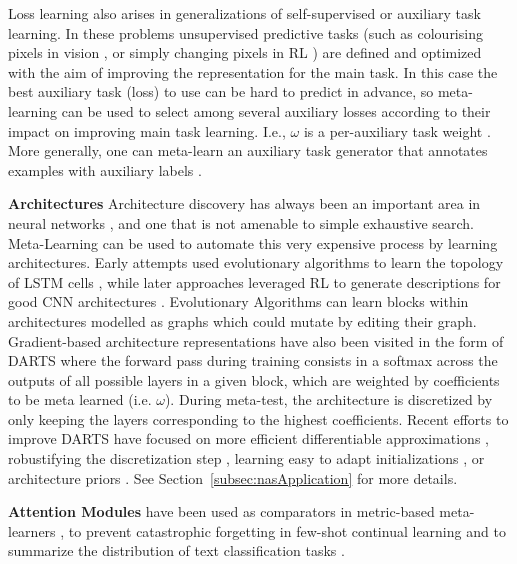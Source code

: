 \documentclass[10pt,journal,compsoc]{IEEEtran}
\newcommand{\keypoint}[1]{\vspace{0.1cm}\noindent\textbf{#1}\quad}
\begin{document}
Loss learning also arises in generalizations of self-supervised
\cite{doersch2017mtlselfsup} or auxiliary task \cite{jaderberg2017unsupauxrl} learning. In these problems unsupervised predictive tasks (such as colourising pixels in vision \cite{doersch2017mtlselfsup}, or simply changing pixels in RL \cite{jaderberg2017unsupauxrl}) are defined and optimized %
with the aim of improving the representation for the main task. In this case the best auxiliary task (loss) to use can be hard to predict in advance, so meta-learning can be used to select among several auxiliary losses according to their impact on improving main task learning. I.e., $\omega$ is a per-auxiliary task weight \cite{xingyu2019auxtask}. More generally, one can meta-learn an auxiliary task generator that annotates examples with auxiliary labels \cite{liu2019self}.




\keypoint{Architectures}
Architecture discovery has always been an important area in neural networks \cite{stanley2019designing,elsken2019nas}, and one that is not amenable to simple exhaustive search. Meta-Learning can be used to automate this very expensive process by learning architectures. Early attempts used evolutionary algorithms to learn the topology of LSTM cells \cite{bayer2009evolvingLSTMcells}, while later approaches leveraged RL to generate descriptions for good CNN architectures \cite{zoph2016neural}. Evolutionary Algorithms \cite{real2018regularized} can learn blocks within architectures modelled as graphs which could mutate by editing their graph. Gradient-based architecture representations have also been visited in the form of DARTS \cite{liu2019darts} where the forward pass during training consists in a softmax across the outputs of all possible layers in a given block, which are weighted by coefficients to be meta learned (i.e. $\omega$). During meta-test, the architecture is discretized by only keeping the layers corresponding to the highest coefficients.
Recent efforts to improve DARTS have focused on more efficient differentiable approximations \cite{xie2019snas}, robustifying the discretization step \cite{Zela2020robustifyingDARTS}, learning easy to adapt initializations \cite{lian2020towards}, or architecture priors \cite{shaw2019meta}. See Section~\ref{subsec:nasApplication} for more details.



\keypoint{Attention Modules} 
have been used as comparators in metric-based meta-learners \cite{hou2019cross}, to prevent catastrophic forgetting in few-shot continual learning \cite{ren2019incremental}  and to summarize the distribution of text classification tasks \cite{bao2019few}.
\end{document}
